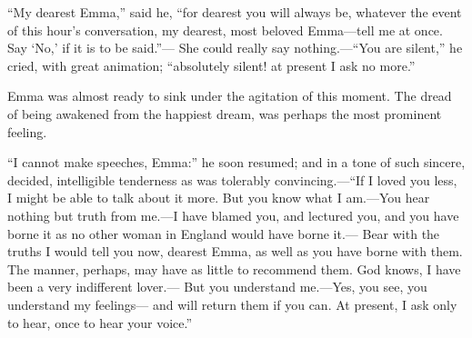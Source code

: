 ``My dearest Emma,'' said he, ``for dearest you will always be,
whatever the event of this hour's conversation, my dearest,
most beloved Emma---tell me at once.  Say `No,' if it is to be said.''---%
She could really say nothing.---``You are silent,'' he cried,
with great animation; ``absolutely silent! at present I ask no more.''

Emma was almost ready to sink under the agitation of this moment.
The dread of being awakened from the happiest dream, was perhaps
the most prominent feeling.

``I cannot make speeches, Emma:''  he soon resumed; and in a tone
of such sincere, decided, intelligible tenderness as was
tolerably convincing.---``If I loved you less, I might be able
to talk about it more.  But you know what I am.---You hear nothing
but truth from me.---I have blamed you, and lectured you, and you
have borne it as no other woman in England would have borne it.---%
Bear with the truths I would tell you now, dearest Emma, as well as
you have borne with them.  The manner, perhaps, may have as little
to recommend them.  God knows, I have been a very indifferent lover.---%
But you understand me.---Yes, you see, you understand my feelings---%
and will return them if you can.  At present, I ask only to hear,
once to hear your voice.''


